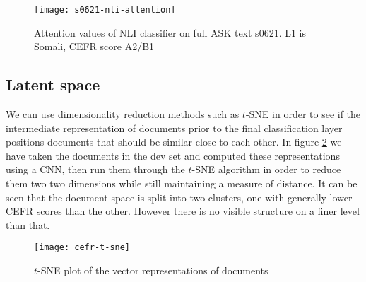 \begin{figure}
  \centering
  \texttt{[image: s0621-nli-attention]}
  \caption{Attention values of NLI classifier on full ASK text s0621.
           L1 is Somali, CEFR score A2/B1}
  \label{fig:s0621-nli-attention}
\end{figure}


\subsection{Latent space}

We can use dimensionality reduction methods such as $t$-SNE in order to see
if the intermediate representation of documents prior to the final
classification layer positions documents that should be similar close to each
other. In figure \ref{fig:cefr-t-sne} we have taken the documents in the dev
set and computed these representations using a \ac{CNN}, then run them through
the $t$-SNE algorithm in order to reduce them two two dimensions while still
maintaining a measure of distance. It can be seen that the document space
is split into two clusters, one with generally lower CEFR scores than the
other. However there is no visible structure on a finer level than that.

\begin{figure}
  \centering
  \texttt{[image: cefr-t-sne]}
  \caption{$t$-SNE plot of the vector representations of documents}
  \label{fig:cefr-t-sne}
\end{figure}
